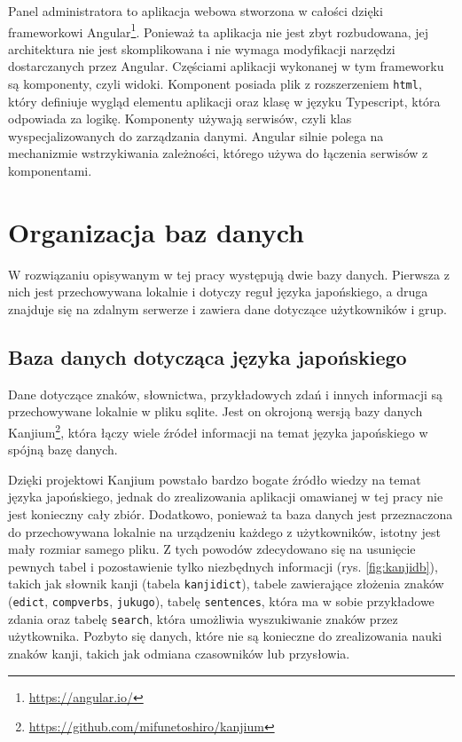 \documentclass[a4paper,twoside,12pt]{book}
\begin{document}
Panel administratora to aplikacja webowa stworzona w całości dzięki frameworkowi Angular\footnote{\url{https://angular.io/}}. Ponieważ ta aplikacja nie jest zbyt rozbudowana, jej architektura nie jest skomplikowana i nie wymaga modyfikacji narzędzi dostarczanych przez Angular. Częściami aplikacji wykonanej w tym frameworku są komponenty, czyli widoki. Komponent posiada plik z rozszerzeniem \texttt{html}, który definiuje wygląd elementu aplikacji oraz klasę w języku Typescript, która odpowiada za logikę. Komponenty używają serwisów, czyli klas wyspecjalizowanych do zarządzania danymi. Angular silnie polega na mechanizmie wstrzykiwania zależności, którego używa do łączenia serwisów z komponentami. 

\section{Organizacja baz danych}

W rozwiązaniu opisywanym w tej pracy występują dwie bazy danych. Pierwsza z nich jest przechowywana lokalnie i dotyczy reguł języka japońskiego, a druga znajduje się na zdalnym serwerze i zawiera dane dotyczące użytkowników i grup.

\subsection{Baza danych dotycząca języka japońskiego}

Dane dotyczące znaków, słownictwa, przykładowych zdań i innych informacji są przechowywane lokalnie w pliku sqlite. Jest on okrojoną wersją bazy danych Kanjium\footnote{\url{https://github.com/mifunetoshiro/kanjium}}, która łączy wiele źródeł informacji na temat języka japońskiego w spójną bazę danych. 

Dzięki projektowi Kanjium powstało bardzo bogate źródło wiedzy na temat języka japońskiego, jednak do zrealizowania aplikacji omawianej w tej pracy nie jest konieczny cały zbiór. Dodatkowo, ponieważ ta baza danych jest przeznaczona do przechowywana lokalnie na urządzeniu każdego z użytkowników, istotny jest mały rozmiar samego pliku. Z tych powodów zdecydowano się na usunięcie pewnych tabel i pozostawienie tylko niezbędnych informacji (rys. \ref{fig:kanjidb}), takich jak słownik kanji (tabela \texttt{kanjidict}), tabele zawierające złożenia znaków (\texttt{edict}, \texttt{compverbs}, \texttt{jukugo}), tabelę \texttt{sentences}, która ma w sobie przykładowe zdania oraz tabelę \texttt{search}, która umożliwia wyszukiwanie znaków przez użytkownika. Pozbyto się danych, które nie są konieczne do zrealizowania nauki znaków kanji, takich jak odmiana czasowników lub przysłowia.
\end{document}
